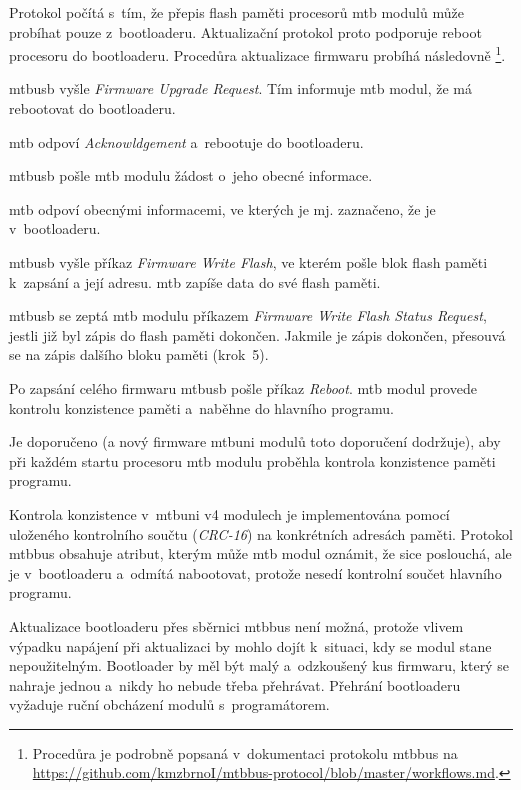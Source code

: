 Protokol počítá s~tím, že přepis flash paměti procesorů \gls{mtb} modulů může
probíhat pouze z~bootloaderu. Aktualizační protokol proto podporuje reboot
procesoru do bootloaderu. Procedůra aktualizace firmwaru probíhá následovně
\footnote{Procedůra je podrobně popsaná v~dokumentaci protokolu
\gls{mtbbus} na
\url{https://github.com/kmzbrnoI/mtbbus-protocol/blob/master/workflows.md}.}.

\begin{compactenum}
\item \gls{mtbusb} vyšle \textit{Firmware Upgrade Request}. Tím informuje \gls{mtb}
	modul, že má rebootovat do bootloaderu.
\item \gls{mtb} odpoví \textit{Acknowldgement} a~rebootuje do bootloaderu.
\item \gls{mtbusb} pošle \gls{mtb} modulu žádost o~jeho obecné informace.
\item \gls{mtb} odpoví obecnými informacemi, ve kterých je mj. zaznačeno,
	že je v~bootloaderu.
\item \gls{mtbusb} vyšle příkaz \textit{Firmware Write Flash}, ve kterém pošle
	blok flash paměti k~zapsání a její adresu. \gls{mtb} zapíše data do své flash
	paměti.
\item \gls{mtbusb} se zeptá \gls{mtb} modulu příkazem \textit{Firmware Write
	Flash Status Request}, jestli již byl zápis do flash paměti dokončen.
	Jakmile je zápis dokončen, přesouvá se na zápis dalšího bloku paměti (krok~5).
\item Po zapsání celého firmwaru \gls{mtbusb} pošle příkaz \textit{Reboot}.
	\gls{mtb} modul provede kontrolu konzistence paměti a~naběhne do hlavního
	programu.
\end{compactenum}

Je doporučeno (a nový firmware \gls{mtbuni} modulů toto doporučení dodržuje),
aby při každém startu procesoru \gls{mtb} modulu proběhla kontrola konzistence
paměti programu.

Kontrola konzistence v~\gls{mtbuni} v4 modulech je implementována pomocí
uloženého kontrolního součtu (\textit{CRC-16}) na konkrétních adresách paměti.
Protokol \gls{mtbbus} obsahuje atribut, kterým může \gls{mtb} modul oznámit, že
sice poslouchá, ale je v~bootloaderu a~odmítá nabootovat, protože nesedí
kontrolní součet hlavního programu.

Aktualizace bootloaderu přes sběrnici \gls{mtbbus} není možná, protože vlivem
výpadku napájení při aktualizaci by mohlo dojít k~situaci, kdy se modul stane
nepoužitelným. Bootloader by měl být malý a~odzkoušený kus firmwaru, který se
nahraje jednou a~nikdy ho nebude třeba přehrávat. Přehrání bootloaderu vyžaduje
ruční obcházení modulů s~programátorem.
